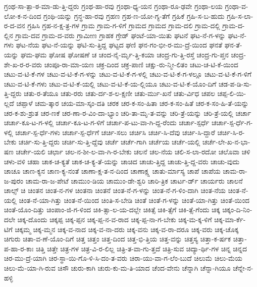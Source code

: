 {ಗ್ರಂಥ-ಸಾ-ತ್ಪಾ-ಠ-ಮಾ-ಡು-ತ್ತಿ-ದ್ದರು
ಗ್ರಂಥ-ಹಾ-ರವು
ಗ್ರಂಥಾ-ಧ್ಯ-ಯನ
ಗ್ರಂಥಾ-ರೂ-ಢವೇ
ಗ್ರಂಥಾ-ಲಯ
ಗ್ರಂಥಾ-ವ-ಲೋ-ಕ-ನ-ದಿಂದ
ಗ್ರಂಥಿ-ಯನ್ನು
ಗ್ರನ್ಥ-ಹಾ-ರವು
ಗ್ರಹಣ
ಗ್ರಹ-ಣ-ಯೋ-ಗ್ಯ-ತೆಗೆ
ಗ್ರಹಿಕೆ
ಗ್ರಹಿ-ಸ-ಬ-ಹುದು
ಗ್ರಹಿ-ಸ-ಲಾ-ರ-ದ-ವನ
ಗ್ರಹಿಸಿ
ಗ್ರಹ-ನ-ಕ್ಷ-ತ್ರ-ಗಳ
ಗ್ರಾಮ
ಗ್ರಾಮ-ಗ-ಳಿಗೆ
ಗ್ರಾಮದ
ಗ್ರಾಮದ
ಗ್ರಾಮ-ದಲಿ
ಗ್ರಾಮ-ದಲ್ಲಿ
ಗ್ರಾಮ-ದ-ಲ್ಲಿನ
ಗ್ರಾಮ-ದವ
ಗ್ರಾಮ-ದ-ವರು
ಗ್ರಾಮೀಣ
ಗ್ರಾಹಕ
ಗ್ರೇಡ್
ಘಂಟೆ-ಯಾ-ಯಿತು
ಘಟನೆ
ಘಟ-ನೆ-ಗ-ಳನ್ನು
ಘಟ-ನೆ-ಗಳು
ಘಟ-ನೆಯ
ಘಟ-ನೆ-ಯನ್ನು
ಘಟಿ-ಸು-ತ್ತಿದ್ದ
ಘಟ್ಟದ
ಘಣಿ
ಘನ-ಗಂ-ಭೀ-ರ-ಮು-ದ್ರೆ-ಯಿಂದ
ಘನತೆ
ಘನ-ತೆ-ಯನ್ನು
ಘಮ-ಘಮ
ಘೋಷ
ಘೋಷಣೆ
ಚ
ಚಂದ-ನೈ-ರ್ಮೃ-ತ್ತಿ-ಕಯಾ
ಚಂದ್ರ-ಗು-ತ್ತಿ-ರಸ್ತೆ
ಚಂದ್ರ-ಗು-ಪ್ತನ
ಚಂದ್ರ-ಶೇ-ಖ-ರ-ರ-ವರು
ಚಂಪೂ-ರಾ-ಮಾ-ಯಣ
ಚಕ್ರ-ದಿಂದ
ಚಕ್ರ-ಪಾಣಿ
ಚಕ್ಷು-ರು-ನ್ಮೀ-ಲಿತಂ
ಚಟು-ಚ-ಟಿ-ಕೆ-ಯಿಂದ
ಚಟು-ವ-ಟಿ-ಕೆ-ಗಳ
ಚಟು-ವ-ಟಿ-ಕೆ-ಗ-ಳನ್ನು
ಚಟು-ವ-ಟಿ-ಕೆ-ಗ-ಳಲ್ಲಿ
ಚಟು-ವ-ಟಿ-ಕೆ-ಗ-ಳಲ್ಲೂ
ಚಟು-ವ-ಟಿ-ಕೆ-ಗ-ಳಿಗೆ
ಚಟು-ವ-ಟಿ-ಕೆ-ಗಳು
ಚಟು-ವ-ಟಿ-ಕೆ-ಯಲ್ಲಿ
ಚಟು-ವ-ಟಿ-ಕೆ-ಯ-ಲ್ಲಿಯೂ
ಚಟು-ವ-ಟಿ-ಕೆ-ಯೊಂ-ದಿಗೆ
ಚಡ-ಪ-ಡಿ-ಸು-ತ್ತಿ-ದ್ದರು
ಚತು-ರ-ತೆಯೂ
ಚತು-ರರು
ಚತು-ರ್ದ-ಶ-ಲ-ಕ್ಷಣೀ
ಚತು-ರ್ಮು-ಖನೆ
ಚತು-ರ್ವಿಧ
ಚಪಲ
ಚಪ್ಪ-ಲಿ-ಯಿ-ಲ್ಲದೆ
ಚಪ್ಪಾಳೆ
ಚಮ-ತ್ಕಾರ
ಚಯ-ಮಾ-ಸ್ಕಂ-ದತಿ
ಚರಕ
ಚರ-ಕ-ಸಂ-ಹಿತಾ
ಚರ-ಕ-ಸಂ-ಹಿತೆ
ಚರ-ಕ-ಸಂ-ಹಿ-ತೆ-ಯನ್ನು
ಚರ-ಕ-ಶು-ಶ್ರುತ
ಚರ-ಣಕೆ
ಚರ-ಣಾ-ರ-ವಿಂ-ದಾ-ಭ್ಯಾಂ
ಚರಿ-ತಾ-ಮೃ-ತ-ವನ್ನು
ಚರಿ-ತ್ರೆ-ಯನ್ನು
ಚರಿ-ತ್ರೆ-ಯಲ್ಲಿ
ಚರ್ಚಾ
ಚರ್ಚಾ-ಕೂ-ಟ-ಗ-ಳಲ್ಲಿ
ಚರ್ಚಾ-ಕೂ-ಟ-ಗ-ಳಿಗೆ
ಚರ್ಚಾ-ಪ-ಟು-ವಾ-ಗಿ-ದ್ದ-ರೆಂದು
ಚರ್ಚಾ-ಸ್ಪರ್ಧೆ
ಚರ್ಚಾ-ಸ್ಪ-ರ್ಧೆ-ಗ-ಳಲ್ಲಿ
ಚರ್ಚಾ-ಸ್ಪ-ರ್ಧೆ-ಗಳು
ಚರ್ಚಾ-ಸ್ಪ-ರ್ಧೆಗೆ
ಚರ್ಚಿ-ಸಲು
ಚರ್ಚಿಸಿ
ಚರ್ಚಿ-ಸಿ-ದೆವು
ಚರ್ಚಿ-ಸಿ-ದ್ದಾರೆ
ಚರ್ಚಿ-ಸಿ-ರ-ಬೇಕು
ಚರ್ಚಿ-ಸು-ತ್ತಿ-ದ್ದರು
ಚರ್ಚಿ-ಸು-ತ್ತಿ-ದ್ದೆವು
ಚರ್ಚೆ
ಚರ್ಚೆ-ಗಾಗಿ
ಚರ್ಚೆಯ
ಚರ್ಚೆ-ಯಲ್ಲಿ
ಚರ್ಚೆ-ಲೇ-ಖ-ನ-ಭಾ-ಷಣ
ಚರ್ಚೇ-ಯಲಿ
ಚರ್ಛಾ
ಚಲ-ನ-ಶೀ-ಲ-ವಾ-ಗಿ-ರ-ಬೇಕು
ಚಲನೆ
ಚಲ-ನೆಯ
ಚಲಿ-ಸ-ಲಾ-ರದೋ
ಚಲೊವಾ
ಚಳಿ
ಚಳು-ವಳಿ
ಚಹಾ
ಚಾಕ-ಚ-ಕ್ಯತೆ
ಚಾಕ-ಚ-ಕ್ಯ-ತೆ-ಯನ್ನು
ಚಾಚಿದ
ಚಾಚು-ತ್ತಿದ್ದ
ಚಾಚು-ತ್ತಿ-ದ್ದ-ವರು
ಚಾಚು-ವುದು
ಚಾಚೂ
ಚಾಣ-ಕ್ಯನ
ಚಾಣ-ಕ್ಯ-ನಂತೆ
ಚಾಣಾ-ಕ್ಷ-ತ-ನ-ದಿಂದ
ಚಾಣಾಕ್ಷ್ಷ
ಚಾತು-ರ್ಮಾಸ್ಯ
ಚಾಪೆ
ಚಾಪೆಯ
ಚಾಮ-ರಾ-ಜ-ಪುರಂ
ಚಾಮ-ರಾ-ಜ-ಪೇಟೆ
ಚಾಮುಂ-ಡಿಯ
ಚಾಮುಂ-ಡೇ-ಶ್ವರಿ
ಚಾರಿ-ತ್ರಿಕ
ಚಾರ್ಟ-ರ್ಡ್
ಚಾರ್ಯರು
ಚಾಲನೆ
ಚಾಲ್ಸ್
ಚಿ
ಚಿಂತನ
ಚಿಂತ-ನ-ಗಳ
ಚಿಂತನಾ
ಚಿಂತನೆ
ಚಿಂತ-ನೆ-ಗ-ಳನ್ನು
ಚಿಂತ-ನೆ-ಗ-ಳಿಂ-ದಾಗಿ
ಚಿಂತ-ನೆಯ
ಚಿಂತ-ನೆ-ಯಲ್ಲಿ
ಚಿಂತ-ನೆ-ಯಾ-ಗಿತ್ತು
ಚಿಂತ-ನೆ-ಯಿಂದ
ಚಿಂತಿ-ಸ-ಬೇಡಿ
ಚಿಂತೆ
ಚಿಂತೆ-ಗ-ಳನ್ನು
ಚಿಂತೆ-ಯಾ-ಗಿತ್ತು
ಚಿಂತೆ-ಯಿಂದ
ಚಿಂತೆ-ಯೊಂ-ದಿತ್ತು
ಚಿಂಪಾಂ-ಜಿ-ಗ-ಳಿಂದ
ಚಿಕಿ-ತ್ಸಾ-ಲ-ಯ-ದಲ್ಲೇ
ಚಿಕಿತ್ಸೆ
ಚಿಕಿ-ತ್ಸೆಗೆ
ಚಿಕಿ-ತ್ಸೆ-ಗೆಂದು
ಚಿಕ್ಕ
ಚಿಕ್ಕಂ-ದಿ-ನಿಂ-ದಲೇ
ಚಿಕ್ಕ-ದೊಂದು
ಚಿಕ್ಕಪ್ಪ
ಚಿಕ್ಕ-ಪ್ಪನ
ಚಿಕ್ಕ-ಪ್ಪ-ನ-ವ-ರಾದ
ಚಿಕ್ಕ-ಪ್ಪ-ನಾ-ಗ-ಬೇಕು
ಚಿಕ್ಕ-ಮ-ಕ್ಕ-ಳಿಗೆ
ಚಿಕ್ಕ-ಮಾ-ರ್ಕೆ-ಟಿಗೆ
ಚಿಕ್ಕಮ್ಮ
ಚಿಕ್ಕ-ಮ್ಮನ
ಚಿಕ್ಕ-ವ-ನಾದ
ಚಿಕ್ಕ-ವ-ನಾ-ದರು
ಚಿಕ್ಕ-ವನು
ಚಿಕ್ಕ-ವ-ರಾ-ದರೂ
ಚಿಕ್ಕ-ವರು
ಚಿಕ್ಕ-ಚೊಕ್ಕ
ಚಿಗುರು
ಚಿತಾ-ವ-ಣೆ-ಯೊಂ-ದಿಗೆ
ಚಿತ್ತ
ಚಿತ್ತಂ
ಚಿತ್ತ-ದಿಂದ
ಚಿತ್ತ-ಭಿ-ತ್ತಿಯ
ಚಿತ್ತ-ವನ್ನು
ಚಿತ್ತಸ್ಯ
ಚಿತ್ತಾ-ಕ-ರ್ಷಕ
ಚಿತ್ತಾ-ಪ-ಹಾ-ರ-ಕಾಃ
ಚಿತ್ತಿ
ಚಿತ್ತೇ
ಚಿತ್ರ-ಗಳ
ಚಿತ್ರ-ವಿ-ರ-ಲಿಲ್ಲ
ಚಿತ್ರಿ-ತ-ವಾ-ಗು-ತ್ತದೆ
ಚಿತ್ರಿ-ಸುವ
ಚಿದ್ಯಾ-ರ್ಥಿ-ಗಳ
ಚಿನ್ನ
ಚಿನ್ನದ
ಚಿರ-ಮು-ದ್ರೆ-ಯಾಗಿ
ಚಿರ-ಸ್ಥಾ-ಯಿ-ಗೊ-ಳಿ-ಸಿ-ದಂ-ತ-ವರು
ಚಿರಾ-ಯು-ವಾ-ಗ-ಲೆಂ-ಬುದೆ
ಚಿಲುಮೆ
ಚಿಲು-ಮೆಯ
ಚಿಲು-ಮೆ-ಯಾ-ಗಿ-ರುವ
ಚಿಸೌ
ಚುರು-ಕಾಗಿ
ಚುರು-ಕು-ಮ-ತಿ-ಯಾದ
ಚೆಂದ-ವೇನು
ಚೆನ್ನಾಗಿ
ಚೆನ್ನಾ-ಗಿಯೂ
ಚೆನ್ನೇ-ನ-ಹಳ್ಳಿ
}
